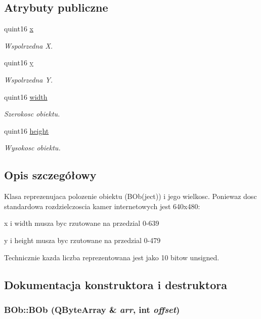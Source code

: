 \subsection*{Atrybuty publiczne}
\begin{DoxyCompactItemize}
\item 
quint16 \hyperlink{class_b_ob_a5dcc6a3c2f4ffaf3d630187e853dd876}{x}
\begin{DoxyCompactList}\small\item\em Wspolrzedna X. \item\end{DoxyCompactList}\item 
quint16 \hyperlink{class_b_ob_ada96bf49e446d3f9a5ce02f36e44c9b4}{y}
\begin{DoxyCompactList}\small\item\em Wspolrzedna Y. \item\end{DoxyCompactList}\item 
quint16 \hyperlink{class_b_ob_a3e1652784396111952cd16a77a666a2b}{width}
\begin{DoxyCompactList}\small\item\em Szerokosc obiektu. \item\end{DoxyCompactList}\item 
quint16 \hyperlink{class_b_ob_ac406681bc6029dc6e41aa53791e9f210}{height}
\begin{DoxyCompactList}\small\item\em Wysokosc obiektu. \item\end{DoxyCompactList}\end{DoxyCompactItemize}


\subsection{Opis szczegółowy}
Klasa reprezenujaca polozenie obiektu (BOb(ject)) i jego wielkosc. Poniewaz dosc standardowa rozdzielczoscia kamer internetowych jest 640x480:

\begin{DoxyItemize}
\item x i width musza byc rzutowane na przedzial 0-\/639 \item y i height musza byc rzutowane na przedzial 0-\/479\end{DoxyItemize}
Technicznie kazda liczba reprezentowana jest jako 10 bitow unsigned. 

\subsection{Dokumentacja konstruktora i destruktora}
\hypertarget{class_b_ob_ab71739ff83cf58d15b42f26274c583d1}{
\subsubsection[{BOb}]{\setlength{\rightskip}{0pt plus 5cm}BOb::BOb (QByteArray \& {\em arr}, \/  int {\em offset})}}
\label{class_b_ob_ab71739ff83cf58d15b42f26274c583d1}



